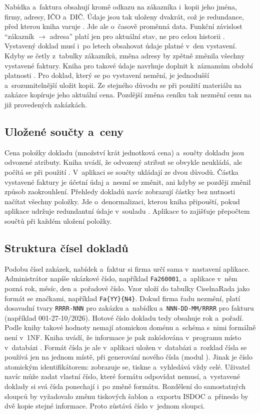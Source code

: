 Nabídka a~faktura obsahují kromě odkazu na zákazníka i~kopii jeho jména, firmy, adresy, IČO a~DIČ. Údaje jsou tak uloženy dvakrát, což je redundance, před kterou kniha varuje \cite[s.~303--304]{Silberschatz2020}. Jde ale o~časově proměnná data. Funkční závislost \enquote{zákazník $\rightarrow$ adresa} platí jen pro aktuální stav, ne pro celou historii \cite[s.~347--348]{Silberschatz2020}. Vystavený doklad musí i~po letech obsahovat údaje platné v~den vystavení. Kdyby se četly z~tabulky zákazníků, změna adresy by zpětně změnila všechny vystavené faktury. Kniha pro takové údaje navrhuje doplnit k~záznamům období platnosti \cite[s.~348]{Silberschatz2020}. Pro doklad, který se po vystavení nemění, je jednodušší a~srozumitelnější uložit kopii. Ze stejného důvodu se při použití materiálu na zakázce kopíruje jeho aktuální cena. Pozdější změna ceníku tak nezmění cenu na již provedených zakázkách.

\subsection{Uložené součty a~ceny}

Cena položky dokladu (množství krát jednotková cena) a~součty dokladu jsou odvozené atributy. Kniha uvádí, že odvozený atribut se obvykle neukládá, ale počítá se při použití \cite[s.~251]{Silberschatz2020}. V~aplikaci se součty ukládají ze dvou důvodů. Částka vystavené faktury je účetní údaj a~nesmí se změnit, ani kdyby se později změnil způsob zaokrouhlení. Přehledy dokladů navíc zobrazují částky bez nutnosti načítat všechny položky. Jde o~denormalizaci, kterou kniha připouští, pokud aplikace udržuje redundantní údaje v~souladu \cite[s.~346]{Silberschatz2020}. Aplikace to zajišťuje přepočtem součtů při každém uložení položky.

\subsection{Struktura čísel dokladů}

Podobu čísel zakázek, nabídek a~faktur si firma určí sama v~nastavení aplikace. Administrátor napíše ukázkové číslo, například \texttt{Fa260001}, a~aplikace v~něm pozná rok, měsíc, den a~pořadové číslo. Vzor uloží do tabulky CiselnaRada jako formát se značkami, například \texttt{Fa\{YY\}\{N4\}}. Dokud firma řadu nezmění, platí dosavadní tvary \texttt{RRRR-NNN} pro zakázku a~nabídku a~\texttt{NNN-DD-MM/RRRR} pro fakturu (například 001-27-10/2026). Hotové číslo dokladu tedy obsahuje rok a~pořadí. Podle knihy takové hodnoty nemají atomickou doménu a~schéma s~nimi formálně není v~1NF. Kniha uvádí, že informace je pak zakódována v~programu místo v~databázi \cite[s.~342--343]{Silberschatz2020}. Formát čísla je ale v~aplikaci uložen v~databázi a~rozklad čísla se používá jen na jednom místě, při generování nového čísla (modul ). Jinak je číslo atomickým identifikátorem: zobrazuje se, tiskne a~vyhledává vždy celé. Uživatel navíc může zadat vlastní číslo, které formátu odpovídat nemusí, a~vystavené doklady si svá čísla ponechají i~po změně formátu. Rozdělení do samostatných sloupců by vyžadovalo změnu tiskových šablon a~exportu ISDOC a~přineslo by dvě kopie stejné informace. Proto zůstává číslo v~jednom sloupci.

